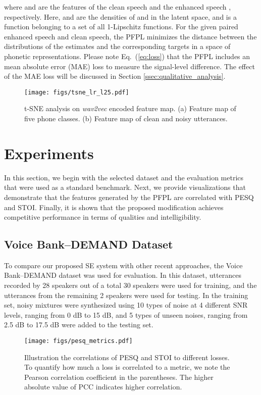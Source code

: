 \documentclass[a4paper]{article}
\begin{document}
where  and  are the features of the clean speech  and the enhanced speech , respectively. Here,  and  are the densities of  and  in the latent space, and  is a function belonging to a set  of all 1-Lipschitz functions. For the given paired enhanced speech and clean speech, the PFPL minimizes the distance between the distributions of the estimates and the corresponding targets in a space of phonetic representations. Please note Eq.~(\ref{eq:loss}) that the PFPL includes an mean absolute error (MAE) loss to measure the signal-level difference. The effect of the MAE loss will be discussed in Section \ref{ssec:qualitative_analysis}. 
\begin{figure}[ht]
\texttt{[image: figs/tsne\_lr\_l25.pdf]}
    \centering 
\caption{t-SNE analysis on \textit{wav2vec} encoded feature map. (a) Feature map of five phone classes. (b) Feature map of clean and noisy utterances.}
    \label{fig:tsne}
\end{figure}
\section{Experiments}
\label{sec:experiments}

In this section, we begin with the selected dataset and the evaluation metrics that were used as a standard benchmark. Next, we provide visualizations that demonstrate that the features generated by the PFPL are correlated with PESQ and STOI. Finally, it is shown that the proposed modification achieves competitive performance in terms of qualities and intelligibility.



\subsection{Voice Bank--DEMAND Dataset}
\label{ssec:voice_bank_demand_dataset}
To compare our proposed SE system with other recent approaches, the Voice Bank--DEMAND dataset \cite{voicebank, demand} was used for evaluation. In this dataset, utterances recorded by 28 speakers out of a total 30 speakers were used for training, and the utterances from the remaining 2 speakers were used for testing. In the training set, noisy mixtures were synthesized using 10 types of noise at 4 different SNR levels, ranging from 0 dB to 15 dB, and 5 types of unseen noises, ranging from 2.5 dB to 17.5 dB were added to the testing set.

\begin{figure*}[t]
    \centering
    \texttt{[image: figs/pesq\_metrics.pdf]}
\caption{Illustration the correlations of PESQ and STOI to different losses. To quantify how much a loss is correlated to a metric, we note the Pearson correlation coefficient in the parentheses. The higher absolute value of PCC indicates higher correlation.}
\label{fig:relation}
\end{figure*}
\end{document}
